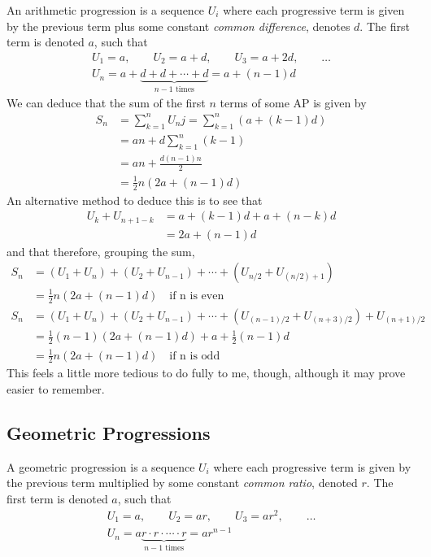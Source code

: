 An arithmetic progression is a sequence \(U_i\) where each progressive term is
given by the previous term plus some constant \emph{common difference}, denotes
\(d\). The first term is denoted \(a\), such that
\begin{gather*}
U_1 = a, \qquad U_2 = a + d, \qquad U_3 = a + 2d, \qquad \dots\\
U_n = a + \underbrace{d  + d  + \dotsb + d}_{\text{\(n - 1\) times}}
    = a + (n - 1)d
\end{gather*}
We can deduce that the sum of the first \(n\) terms of some AP is given by
\begin{align*}
S_n &= \sum_{k = 1}^n U_nj = \sum_{k = 1}^n (a + (k - 1)d) \\
    &= an + d\sum_{k = 1}^n (k - 1) \\
    &= an + \frac{d(n - 1)n} 2 \\
    &= \tfrac 12 n (2a + (n - 1)d)
\end{align*}
An alternative method to deduce this is to see that
\begin{align*}
U_k + U_{n + 1 - k} &= a + (k - 1)d + a + (n - k)d \\
    &= 2a + (n - 1)d
\end{align*}
and that therefore, grouping the sum,
\begin{align*}
S_n &= (U_1 + U_n) + (U_2 + U_{n - 1}) + \dotsb
     + (U_{n / 2} + U_{(n / 2) + 1}) \\
    &= \tfrac 12 n(2a + (n - 1)d) \quad \text{if n is even} \\
S_n &= (U_1 + U_n) + (U_2 + U_{n - 1}) + \dotsb
     + (U_{(n - 1) / 2} + U_{(n + 3) / 2}) + U_{(n + 1) / 2} \\
    &= \tfrac 12 (n - 1)(2a + (n - 1)d) + a + \tfrac 12 (n - 1) d \\
    &= \tfrac 12 n(2a + (n - 1)d) \quad \text{if n is odd}
\end{align*}
This feels a little more tedious to do fully to me, though, although it may
prove easier to remember.


\subsection{Geometric Progressions} \label{sec_seq_GP}

A geometric progression is a sequence \(U_i\) where each progressive term is
given by the previous term multiplied by some constant \emph{common ratio},
denoted \(r\). The first term is denoted \(a\), such that
\begin{gather*}
U_1 = a, \qquad U_2 = ar, \qquad U_3 = ar^2, \qquad \dots\\
U_n = a\underbrace{r \cdot r \cdot \dotsb \cdot r}_{\text{\(n - 1\) times}}
    = ar^{n - 1}
\end{gather*}

